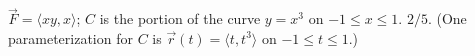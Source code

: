 {$\vec F = \langle xy,x\rangle$; $C$ is the portion of the curve $y=x^3$ on $-1\leq x\leq 1$.
}
{$2/5$. (One parameterization for $C$ is $\vec r(t) = \langle t,t^3\rangle$ on $-1\leq t\leq 1$.)
}

